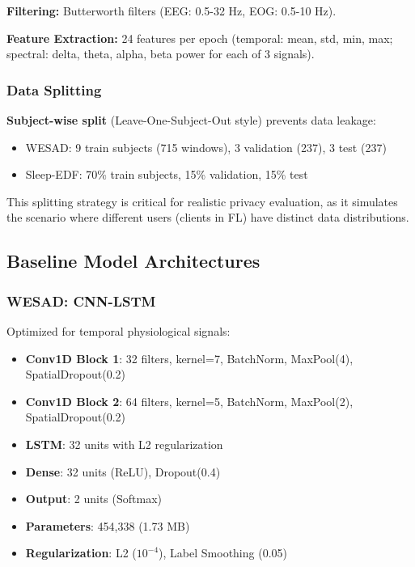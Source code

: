 \documentclass[conference]{IEEEtran}
\begin{document}
\textbf{Filtering:} Butterworth filters (EEG: 0.5-32 Hz, EOG: 0.5-10 Hz).

\textbf{Feature Extraction:} 24 features per epoch (temporal: mean, std, min, max; spectral: delta, theta, alpha, beta power for each of 3 signals).

\subsubsection{Data Splitting}

\textbf{Subject-wise split} (Leave-One-Subject-Out style) prevents data leakage:
\begin{itemize}
    \item WESAD: 9 train subjects (715 windows), 3 validation (237), 3 test (237)
    \item Sleep-EDF: 70\% train subjects, 15\% validation, 15\% test
\end{itemize}

This splitting strategy is critical for realistic privacy evaluation, as it simulates the scenario where different users (clients in FL) have distinct data distributions.

\subsection{Baseline Model Architectures}

\subsubsection{WESAD: CNN-LSTM}

Optimized for temporal physiological signals:

\begin{itemize}
    \item \textbf{Conv1D Block 1}: 32 filters, kernel=7, BatchNorm, MaxPool(4), SpatialDropout(0.2)
    \item \textbf{Conv1D Block 2}: 64 filters, kernel=5, BatchNorm, MaxPool(2), SpatialDropout(0.2)
    \item \textbf{LSTM}: 32 units with L2 regularization
    \item \textbf{Dense}: 32 units (ReLU), Dropout(0.4)
    \item \textbf{Output}: 2 units (Softmax)
    \item \textbf{Parameters}: 454,338 (1.73 MB)
    \item \textbf{Regularization}: L2 ($10^{-4}$), Label Smoothing (0.05)
\end{itemize}
\end{document}
